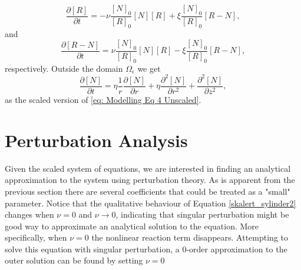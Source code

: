 \documentclass{article}
\begin{document}
\begin{equation}
    \frac{\partial [R]}{\partial t} = - \nu \frac{[N]_0}{[R]_0} [N][R] + \xi \frac{[N]_0}{[R]_0} [R-N],
    \label{skalert_sylinder3}
\end{equation}
and 
\begin{equation}
    \frac{\partial [R-N]}{\partial t} = \nu \frac{[N]_0}{[R]_0} [N][R] - \xi \frac{[N]_0}{[R]_0} [R-N],
    \label{skalert_sylinder4}
\end{equation}
respectively. Outside the domain $\Omega_\epsilon$ we get
\begin{equation}
    \frac{\partial [N]}{\partial t} = 
    \eta \frac{1}{r} \frac{\partial [N]}{\partial r} +\eta  \frac{\partial^2 [N]}{\partial r^2}  +  \frac{\partial^2 [N]}{\partial z^2},
    \label{skalert_sylinder5}
\end{equation}
as the scaled version of \eqref{eq: Modelling Eq 4 Unscaled}.

\section{Perturbation Analysis}
Given the scaled system of equations, we are interested in finding an analytical approximation to the system using perturbation theory. As is apparent from the previous section there are several coefficients that could be treated as a "small" parameter. Notice that the qualitative behaviour of Equation \eqref{skalert_sylinder2} changes when $\nu = 0$ and $\nu \rightarrow 0$, indicating that singular perturbation might be good way to approximate an analytical solution to the equation. More specifically, when $\nu = 0$ the nonlinear reaction term disappears. Attempting to solve this equation with singular perturbation, a 0-order approximation to the outer solution can be found by setting $\nu = 0$
\end{document}
